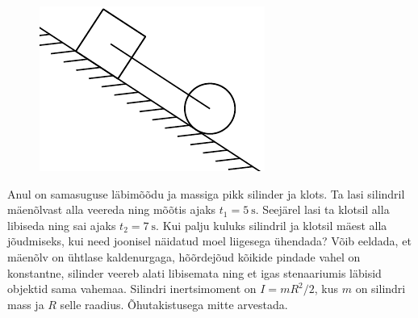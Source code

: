 \documentclass[10pt]{article}
\begin{document}

\begin{figure}
    \vspace{-25pt}
    \begin{center}
        \includegraphics[width=\linewidth]{2023-lahg-09-yl.pdf}
    \end{center}
\end{figure}
Anul on samasuguse läbimõõdu ja massiga pikk silinder ja klots. Ta lasi silindril mäenõlvast alla veereda ning mõõtis ajaks $t_1 = \SI{5}{\second}$. Seejärel lasi ta klotsil alla libiseda ning sai ajaks $t_2 = \SI{7}{\second}$. Kui palju kuluks silindril ja klotsil mäest alla jõudmiseks, kui need joonisel näidatud moel liigesega ühendada? Võib eeldada, et mäenõlv on ühtlase kaldenurgaga, hõõrdejõud kõikide pindade vahel on konstantne, silinder veereb alati libisemata ning et igas stenaariumis läbisid objektid sama vahemaa. Silindri inertsimoment on $I=mR^2/2$, kus $m$ on silindri mass ja $R$ selle raadius. Õhutakistusega mitte arvestada.
\end{document}
